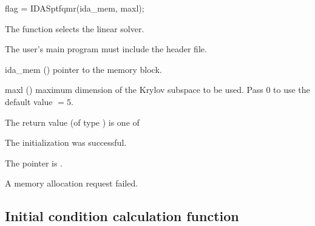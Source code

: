{}
{
  flag = IDASptfqmr(ida\_mem, maxl);
}
{
  The function  selects the {\idasptfqmr} linear solver. 

  The user's main program must include the  header file.
}
{
  \begin{args}
  \item[ida\_mem] ()
    pointer to the {\idas} memory block.
  \item[maxl] ()
    maximum dimension of the Krylov subspace to be used. Pass $0$ to use the 
    default value $=5$.
  \end{args}
}
{
  The return value  (of type ) is one of
  \begin{args}
  \item[\Id{IDASPILS\_SUCCESS}] 
    The {\idasptfqmr} initialization was successful.
  \item[\Id{IDASPILS\_MEM\_NULL}]
    The  pointer is .
  \item[\Id{IDASPILS\_MEM\_FAIL}]
    A memory allocation request failed.
  \end{args}
}
{}


\subsection{Initial condition calculation function}\label{ss:idacalcic}


